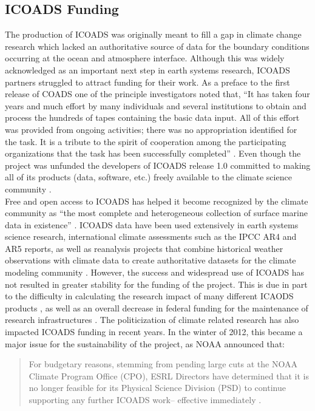 \documentclass[thesis,tocnosub,noragright,centerchapter,12pt]{uiucecethesis09}
\begin{document}
\subsection*{ICOADS Funding}

The production of ICOADS was originally meant to fill a gap in climate
change research which lacked an authoritative source of data for the
boundary conditions occurring at the ocean and atmosphere interface.
Although this was widely acknowledged as an important next step in earth
systems research, ICOADS partners struggled to attract funding for their
work. As a preface to the first release of COADS one of
the principle investigators noted that, ``It has taken four years and
much effort by many individuals and several institutions to obtain and
process the hundreds of tapes containing the basic data input. All of
this effort was provided from ongoing activities; there was no
appropriation identified for the task. It is a tribute to the spirit of
cooperation among the participating organizations that the task has been
successfully completed'' \citep{slutz1985comprehensive}. Even though the project
was unfunded the developers of ICOADS release 1.0 committed to making
all of its products (data, software, etc.) freely available to the
climate science community \citep{worley2005icoads}.\\

Free and open access to ICOADS has helped it become recognized by the
climate community as ``the most complete and heterogeneous collection of
surface marine data in existence'' \citep{woodruff2011icoads}. ICOADS data
have been used extensively in earth systems science research,
international climate assessments such as the IPCC AR4 and AR5 reports,
as well as reanalysis projects that
combine historical weather observations with climate data to create
authoritative datasets for the climate modeling community \citep{kalnay1996ncep}. However, the success and widespread use of ICOADS has not resulted in
greater stability for the funding of the project. This is due in part to
the difficulty in calculating the research impact of many different ICAODS products
\citep{weber2014coop}, as well as an overall
decrease in federal funding for the maintenance of
research infrastructures \citep{berman2013will}. The politicization of climate related research has also impacted
ICOADS funding in recent years. In the winter of 2012, this became a major issue for the
sustainability of the project, as NOAA announced that:

\begin{quote}
For budgetary reasons, stemming from pending large cuts at the NOAA
Climate Program Office (CPO), ESRL Directors have determined that it is
no longer feasible for its Physical Science Division (PSD) to continue
supporting any further ICOADS work-- effective immediately \citep{icoads2012}.
\end{quote}
\end{document}
